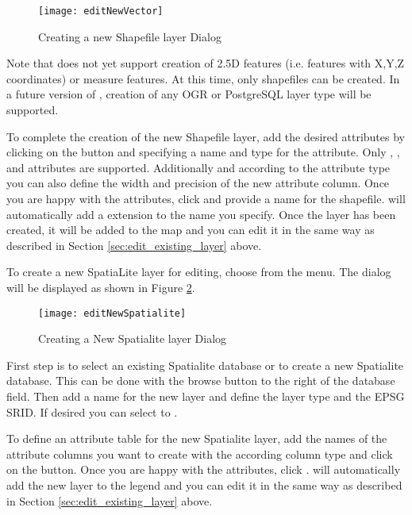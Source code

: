 \begin{figure}[ht]
   \centering
   \texttt{[image: editNewVector]}
   \caption{Creating a new Shapefile layer Dialog \nixcaption}\label{fig:newvectorlayer}
\end{figure}

Note that \qg does not yet support creation of 2.5D
features (i.e. features with X,Y,Z coordinates) or measure features. At this
time, only shapefiles can be created. In a future version of \qg, creation of
any OGR or PostgreSQL layer type will be supported.

To complete the creation of the new Shapefile layer, add the desired attributes by
clicking on the  button and specifying a name and type for the
attribute. Only , , and
 attributes are supported. Additionally and
according to the attribute type you can also define the width and precision
of the new attribute column. Once you are happy with the attributes, click
 and provide a name for the shapefile. \qg will automatically add
a  extension to the name you specify. Once
the layer has been created, it will be added to the map and you can edit it in
the same way as described in Section \ref{sec:edit_existing_layer} above.

\label{sec:create spatialite}

To create a new SpatiaLite layer for editing, choose  \arrow
{} from the
 menu. The  dialog will be
displayed as shown in Figure \ref{fig:newspatialitelayer}.

\begin{figure}[ht]
   \centering
   \texttt{[image: editNewSpatialite]}
   \caption{Creating a New Spatialite layer Dialog \nixcaption}\label{fig:newspatialitelayer}
\end{figure}

First step is to select an existing Spatialite database or to create a new
Spatialite database. This can be done with the browse  button
to the right of the database field. Then add a name for the new layer and
define the layer type and the EPSG SRID. If desired you can select to
.

To define an attribute table for the new Spatialite layer, add the names
of the attribute columns you want to create with the according column type
and click on the  button. Once you are happy
with the attributes, click . \qg will automatically add the new
layer to the legend and you can edit it in the same way as described in
Section \ref{sec:edit_existing_layer} above.

